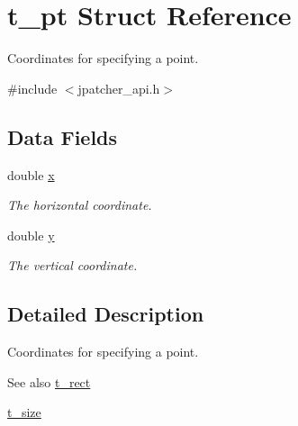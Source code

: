 \hypertarget{structt__pt}{
\section{t\_\-pt Struct Reference}
\label{structt__pt}
}


Coordinates for specifying a point.  


{\ttfamily \#include $<$jpatcher\_\-api.h$>$}\subsection*{Data Fields}
\begin{DoxyCompactItemize}
\item 
\hypertarget{structt__pt_abd1171389dfefa1b2cfc94c99e758936}{
double \hyperlink{structt__pt_abd1171389dfefa1b2cfc94c99e758936}{x}}
\label{structt__pt_abd1171389dfefa1b2cfc94c99e758936}

\begin{DoxyCompactList}\small\item\em The horizontal coordinate. \item\end{DoxyCompactList}\item 
\hypertarget{structt__pt_a1876ee367c9ff280c0710918d4ce8d3b}{
double \hyperlink{structt__pt_a1876ee367c9ff280c0710918d4ce8d3b}{y}}
\label{structt__pt_a1876ee367c9ff280c0710918d4ce8d3b}

\begin{DoxyCompactList}\small\item\em The vertical coordinate. \item\end{DoxyCompactList}\end{DoxyCompactItemize}


\subsection{Detailed Description}
Coordinates for specifying a point. \begin{DoxySeeAlso}{See also}
\hyperlink{structt__rect}{t\_\-rect} 

\hyperlink{structt__size}{t\_\-size} 
\end{DoxySeeAlso}
